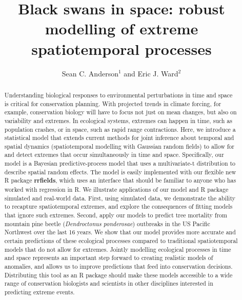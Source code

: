 \documentclass[12pt,english]{article}
\title{
  Black swans in space:
  robust modelling of extreme spatiotemporal processes}
\author{
Sean C. Anderson$^1$ and
Eric J. Ward$^2$
}
\date{}
\begin{document}
\maketitle
\RaggedRight
{}

\begin{spacing}{1.3}

\begin{abstract}

Understanding biological responses to environmental perturbations in time and
space is critical for conservation planning. With projected trends in climate
forcing, for example, conservation biology will have to focus not just on mean
changes, but also on variability and extremes. In ecological systems, extremes
can happen in time, such as population crashes, or in space, such as rapid
range contractions. Here, we introduce a statistical model that extends current
methods for joint inference about temporal and spatial dynamics (spatiotemporal
modelling with Gaussian random fields) to allow for and detect extremes that
occur simultaneously in time and space. Specifically, our model is a Bayesian
predictive-process model that uses a multivariate-t distribution to describe
spatial random effects. The model is easily implemented with our flexible new R
package \textbf{rrfields}, which uses an interface that should be familiar to
anyone who has worked with regression in R. We illustrate applications of our
model and R package simulated and real-world data. First, using simulated data,
we demonstrate the ability to recapture spatiotemporal extremes, and explore
the consequences of fitting models that ignore such extremes. Second, apply our
models to predict tree mortality from mountain pine beetle (\emph{Dendroctonus
  ponderosae}) outbreaks in the US Pacific Northwest over the last 16 years.
We show that our model provides more accurate and certain
predictions of these ecological processes compared to traditional
spatiotemporal models that do not allow for extremes. Jointly modelling
ecological processes in time and space represents an important step forward to
creating realistic models of anomalies, and allows us to improve predictions
that feed into conservation decisions. Distributing this tool as an R package
should make these models accessible to a wide range of conservation biologists
and scientists in other disciplines interested in predicting extreme events.
\end{abstract}


\end{spacing}
\end{document}
